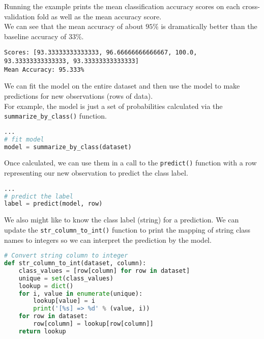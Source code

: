 \documentclass[12pt]{article}
\begin{document}
Running the example prints the mean classification accuracy scores on each cross-validation fold as well as the mean accuracy score.\\

We can see that the mean accuracy of about $95\%$ is dramatically better than the baseline accuracy of $33\%$.\\

\begin{lstlisting}
Scores: [93.33333333333333, 96.66666666666667, 100.0, 93.33333333333333, 93.33333333333333]
Mean Accuracy: 95.333%
\end{lstlisting}

We can fit the model on the entire dataset and then use the model to make predictions for new observations (rows of data).\\

For example, the model is just a set of probabilities calculated via the \verb|summarize_by_class()| function.\\

\begin{lstlisting}[language=python]
...
# fit model
model = summarize_by_class(dataset)

\end{lstlisting}

Once calculated, we can use them in a call to the \verb|predict()| function with a row representing our new observation to predict the class label.\\

\begin{lstlisting}[language=python]
...
# predict the label
label = predict(model, row)

\end{lstlisting}

We also might like to know the class label (string) for a prediction. We can update the \verb|str_column_to_int()| function to print the mapping of string class names to integers so we can interpret the prediction by the model.\\

\begin{lstlisting}[language=python]
# Convert string column to integer
def str_column_to_int(dataset, column):
	class_values = [row[column] for row in dataset]
	unique = set(class_values)
	lookup = dict()
	for i, value in enumerate(unique):
		lookup[value] = i
		print('[%s] => %d' % (value, i))
	for row in dataset:
		row[column] = lookup[row[column]]
	return lookup

\end{lstlisting}
\end{document}
